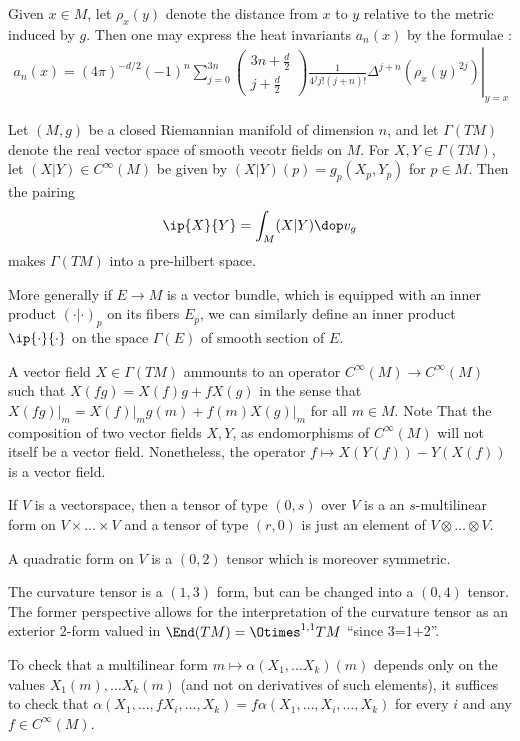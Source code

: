 Given $x\in M$, let $\rho_x(y)$ denote the distance from $x$ to $y$ relative to the metric induced by $g$.  Then one may express the heat invariants $a_n(x)$ by the formulae \cite[Theorem 1.2.1]{polterovichHeatInvariantsRiemannian2000}:
\begin{align}
    a_n(x) = \left.(4 \pi)^{-d / 2}(-1)^n \sum_{j=0}^{3 n}\left(\begin{array}{c}
                                                                        3 n+\frac{d}{2} \\
                                                                        j+\frac{d}{2}
                                                                    \end{array}\right) \frac{1}{4^j j !(j+n) !} \Delta^{j+n}\left(\rho_x(y)^{2 j}\right)\right|_{y=x}
\end{align}


\newpage

Let $(M,g)$ be a closed Riemannian manifold of dimension $n$, and let $\Gamma(TM)$ denote the real vector space of smooth vecotr fields on $M$. For $X,Y \in \Gamma(TM)$, let $(X|Y) \in C^\infty(M)$ be given by $(X|Y)(p) = g_p(X_p,Y_p)$ for $p \in M$. Then the pairing
\begin{align*}
    \ip{X}{Y} = \int_M (X|Y) \dop v_g
\end{align*}
makes $\Gamma(TM)$ into a pre-hilbert space.

More generally if $E \to M$ is a vector bundle, which is equipped with an inner product $(\cdot | \cdot)_p$ on its fibers $E_p$, we can similarly define an inner product $\ip{\cdot}{\cdot}$ on the space $\Gamma(E)$ of smooth section of $E$.

\newpage
A vector field $X \in \Gamma(TM)$ ammounts to an operator $C^\infty(M) \to C^\infty(M)$ such that $X(fg)= X(f)g+fX(g)$ in the sense that $X(fg)\vert_m = X(f)\vert_m g(m) + f(m) X(g)\vert_m$ for all $m \in M$. Note That the composition of two vector fields $X,Y$, as endomorphisms of $C^\infty(M)$ will not itself be a vector field. Nonetheless, the operator $f \mapsto X(Y(f)) - Y(X(f))$ is a vector field.

If $V$ is a vectorspace, then a tensor of type $(0,s)$ over $V$ is a an $s$-multilinear form on $V\times\dots \times V$ and a tensor of type $(r,0)$ is just an element of $V \otimes \dots \otimes V$.

A quadratic form on $V$ is a $(0,2)$ tensor which is moreover symmetric.

The curvature tensor is a $(1,3)$ form, but can be changed into a $(0,4)$ tensor. The former perspective allows for the interpretation of the curvature tensor as an exterior $2$-form valued in $\End(TM) = \Otimes^{1,1} TM$ ``since 3=1+2''.

To check that a multilinear form $m \mapsto \alpha(X_1,\dots X_k)(m)$ depends only on the values $X_1(m),\dots X_k(m)$ (and not on derivatives of such elements), it suffices to check that $\alpha(X_1 ,\dots, fX_i,\dots, X_k) = f \alpha(X_1 ,\dots, X_i,\dots, X_k)$ for every $i$ and any $f\in C^\infty(M)$.

